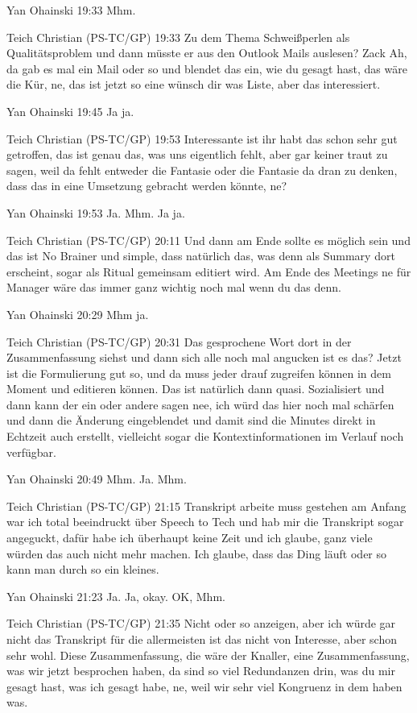 Yan Ohainski   19:33
Mhm.

Teich Christian (PS-TC/GP)   19:33
Zu dem Thema Schweißperlen als Qualitätsproblem und dann müsste er aus den Outlook Mails auslesen? Zack Ah, da gab es mal ein Mail oder so und blendet das ein, wie du gesagt hast, das wäre die Kür, ne, das ist jetzt so eine wünsch dir was Liste, aber das interessiert.

Yan Ohainski   19:45
Ja ja.

Teich Christian (PS-TC/GP)   19:53
Interessante ist ihr habt das schon sehr gut getroffen, das ist genau das, was uns eigentlich fehlt, aber gar keiner traut zu sagen, weil da fehlt entweder die Fantasie oder die Fantasie da dran zu denken, dass das in eine Umsetzung gebracht werden könnte, ne?

Yan Ohainski   19:53
Ja.
Mhm.
Ja ja.

Teich Christian (PS-TC/GP)   20:11
Und dann am Ende sollte es möglich sein und das ist No Brainer und simple, dass natürlich das, was denn als Summary dort erscheint, sogar als Ritual gemeinsam editiert wird. Am Ende des Meetings ne für Manager wäre das immer ganz wichtig noch mal wenn du das denn.

Yan Ohainski   20:29
Mhm ja.

Teich Christian (PS-TC/GP)   20:31
Das gesprochene Wort dort in der Zusammenfassung siehst und dann sich alle noch mal angucken ist es das? Jetzt ist die Formulierung gut so, und da muss jeder drauf zugreifen können in dem Moment und editieren können. Das ist natürlich dann quasi.
Sozialisiert und dann kann der ein oder andere sagen nee, ich würd das hier noch mal schärfen und dann die Änderung eingeblendet und damit sind die Minutes direkt in Echtzeit auch erstellt, vielleicht sogar die Kontextinformationen im Verlauf noch verfügbar.

Yan Ohainski   20:49
Mhm.
Ja.
Mhm.

Teich Christian (PS-TC/GP)   21:15
Transkript arbeite muss gestehen am Anfang war ich total beeindruckt über Speech to Tech und hab mir die Transkript sogar angeguckt, dafür habe ich überhaupt keine Zeit und ich glaube, ganz viele würden das auch nicht mehr machen. Ich glaube, dass das Ding läuft oder so kann man durch so ein kleines.

Yan Ohainski   21:23
Ja.
Ja, okay.
OK, Mhm.

Teich Christian (PS-TC/GP)   21:35
Nicht oder so anzeigen, aber ich würde gar nicht das Transkript für die allermeisten ist das nicht von Interesse, aber schon sehr wohl. Diese Zusammenfassung, die wäre der Knaller, eine Zusammenfassung, was wir jetzt besprochen haben, da sind so viel Redundanzen drin, was du mir gesagt hast, was ich gesagt habe, ne, weil wir sehr viel Kongruenz in dem haben was.


